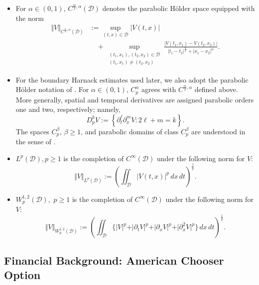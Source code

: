 \documentclass[11pt, a4paper, leqno]{amsart}
\numberwithin{equation}{section}
\theoremstyle{plain}
\theoremstyle{definition}
\theoremstyle{remark}
\def\geq{\geqslant}
\begin{document}
\begin{itemize}

    \item {
    For $\alpha\in(0,1)$,
    $C^{\frac{\alpha}{2},\alpha}(\mathcal{D})$ denotes the
    parabolic H\"older space equipped with the norm
    \[
    \begin{aligned}
    \Vert V\Vert_{C^{\frac{\alpha}{2},\alpha}(\mathcal{D})}
    &:=
    \sup_{(t,x)\in\mathcal{D}}|V(t,x)|
    \\
    &\quad+
    \sup_{\substack{(t_1,x_1),(t_2,x_2)\in\mathcal{D}\\
    (t_1,x_1)\neq(t_2,x_2)}}
    \frac{|V(t_1,x_1)-V(t_2,x_2)|}
    {|t_1-t_2|^{\frac{\alpha}{2}}+|x_1-x_2|^\alpha}.
    \end{aligned}
    \]
    }

    \item
    {
    For the boundary Harnack estimates used later, we also adopt the
    parabolic H\"older notation of \cite{Kukuljan2022}. For
    $\alpha\in(0,1)$, $C_p^\alpha$ agrees with
    $C^{\frac{\alpha}{2},\alpha}$ defined above. More generally, spatial
    and temporal derivatives are assigned parabolic orders one and two,
    respectively; namely,
    \[
        D_p^k V
        :=
        \left\{
        \partial_t^\ell\partial_x^m V:
        2\ell+m=k
        \right\}.
    \]
    The spaces $C_p^\beta$, $\beta\geq1$, and parabolic domains of class
    $C_p^\beta$ are understood in the sense of
    \cite[Definitions~1.1 and~2.2]{Kukuljan2022}.
    }

    \item 
    $L^p(\mathcal{D}),p\geq1$ is the completion of $C^\infty(\mathcal{D})$
    under the following norm for $V$:
    \[
    \Vert V \Vert_{L^p(\mathcal{D})}:=
    \left(\iint_\mathcal{D} {\vert V(t,x)\vert}^p \,dx\, dt\right)^{\frac{1}{p}}.
    \]

    \item 
    $W^{1,2}_p(\mathcal{D}),$ $p\geq1$ is the completion of $C^{\infty}(\mathcal{D})$
    under the following norm for $V$:
    \[
    \Vert V \Vert_{W^{1,2}_p(\mathcal{D})}
    :=\left(
    \iint_\mathcal{D}
    \big\{
    \vert V \vert^p
    +\vert \partial_t V \vert^p
    +\vert \partial_x V \vert^p
    +\vert \partial^2_x V \vert^p
    \big\}
    \,dx\,dt
    \right)^{\frac{1}{p}}.
    \]

\end{itemize}


\subsection{Financial Background: American Chooser Option}
\end{document}
